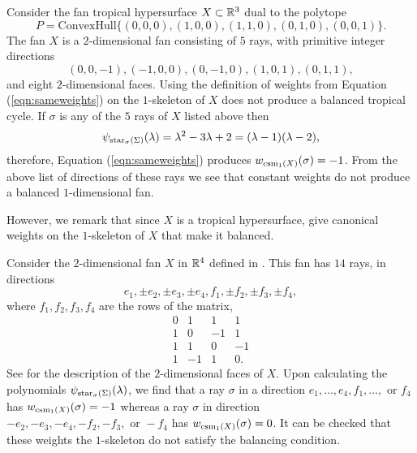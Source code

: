\begin{exa}\label{ex:unbalancedHypersurface}
Consider the fan tropical hypersurface $X \subset {\mathbb R}^3$ dual to the polytope 
$$P = \text{ConvexHull}\{ (0, 0, 0), (1, 0, 0), (1, 1, 0), (0, 1, 0), (0, 0, 1)\}.$$
The fan $X$ is a $2$-dimensional fan consisting of $5$ rays, with primitive
integer directions $$(0, 0, -1), (-1, 0, 0), (0, -1, 0), (1, 0, 1), (0, 1,
1),$$ and eight $2$-dimensional faces. 
Using the definition of weights from Equation (\ref{eqn:sameweights}) on the $1$-skeleton of $X$ does not produce a balanced tropical cycle. 
If $\sigma$ is any of the $5$ rays of $X$ listed above then 
$$\psi_{{\operatorname{star}_{\sigma}(\Sigma)}}(\lambda) = \lambda^2 - 3\lambda + 2 = (\lambda-1) (\lambda-2),$$
therefore,  Equation (\ref{eqn:sameweights}) produces $w_{\operatorname{csm}_1(X)}(\sigma) = -1$.
From the above list of directions of these rays
we see that constant weights do not produce a balanced $1$-dimensional fan. 

However, we remark that since $X$ is a tropical hypersurface, \cite{BertrandBihan} give canonical weights on the $1$-skeleton of $X$ that make it balanced. 
\end{exa}
 
\begin{exa}
Consider the $2$-dimensional fan $X$ in $\mathbb{R}^4$ defined in \cite[Section 5.6]{BabaeeHuh}. 
This fan has $14$ rays, in directions
$$ e_1,  \pm e_2, \pm e_3, \pm  e_4, f_1, \pm f_2, \pm f_3, \pm f_4,$$
where $f_1, f_2, f_3, f_4$ are the rows of the matrix, 
$$\begin{array}{rrrr}
0 & 1 & 1 & 1 \\ 
1 & 0 & -1 & 1 \\ 
1 & 1 & 0 & -1 \\ 
1 & -1 & 1 & 0.
\end{array} 
$$
See \cite[Section 5.6]{BabaeeHuh} for the description of the $2$-dimensional faces of $X$. 
Upon calculating the polynomials $\psi_{{\operatorname{star}_{\sigma}(\Sigma)}}(\lambda)$, we find that  a ray $\sigma$ in a direction 
$e_1, \dots, e_4, f_1, \dots, \text{ or } f_4$ has
$w_{\operatorname{csm}_1(X)}(\sigma) = -1$ whereas a  ray $\sigma$ in direction 
$-e_2, -e_3, -e_4, -f_2, -f_3, \text{ or } -f_4$ has $w_{\operatorname{csm}_1(X)}(\sigma) = 0$. It can be checked that these weights the $1$-skeleton do not satisfy the balancing condition. 
\end{exa}



